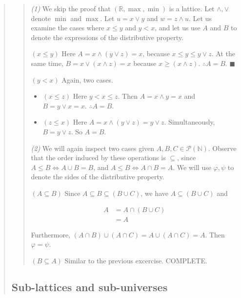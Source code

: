 \documentclass[a4paper, 12pt]{article}
\theoremstyle{definition}
\theoremstyle{definition}
\theoremstyle{definition}
\begin{document}
\begin{quote}
\begin{quote}
\textit{(1)} We skip the proof that $(\mathbb{R}, \max, \min)$ is a lattice.
Let $\land , \lor $ denote $\min$ and $\max$. Let $u = x \lor  y$ and $w = z
\land  u$. Let us examine the cases where $x \leq y$ and 
$y < x$, and let us use $A$ and $B$ to denote the expressions 
of the distributive property.

$( x \leq y )$ Here $A = x \land (y \lor  z) = x$, because 
$x \leq y \leq y \lor  z$. At the same time, 
$B =  x \lor (x \land  z) = x$ because $x \geq (x \land  z)$.
$\therefore A = B$. $\blacksquare$

$(y < x)$ Again, two cases. 

\begin{itemize}
    \item $(x \leq z)$ Here $y < x \leq z$. Then $A = x \land y = x$ 
and $B = y \lor x = x$. $\therefore A = B$. 
    \item $(z \leq x)$ Here $A = x \land (y\lor  z) = y \lor  z$. 
        Simultaneously, $B = y \lor z$.
        So $A = B$.
\end{itemize}


\textit{(2)} We will again inspect two cases given $A, B, C \in
\mathcal{P}(\mathbb{N})$. Observe that the order induced by these operations is
$\subseteq$, since $A \leq B \iff A \cup B = B$, and $A \leq B \iff A \cap B =
A$. We will use $\varphi, \psi$ to denote the sides of the distributive
property. 

$(A \subseteq B)$ Since $A \subseteq B \subseteq (B \cup C)$, we have 
$A \subseteq (B \cup C)$ and

\begin{align*}
    A &= A \cap (B \cup C) \\ 
      &= A
\end{align*}

Furthermore, $(A \cap B) \cup (A \cap C) = A \cup (A \cap C) = A$. Then $\varphi = \psi$. 

$(B \subseteq A)$ Similar to the previous excercise. COMPLETE.


\end{quote}
\normalsize


\subsection{Sub-lattices and sub-universes}


\end{quote}
\end{document}
